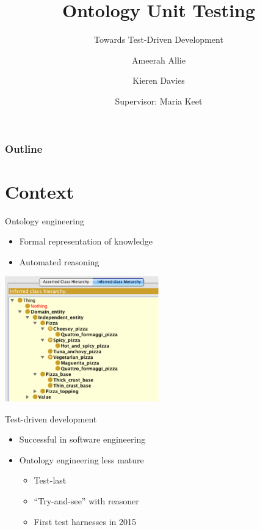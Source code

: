 \documentclass[17pt,mathserif]{beamer}
\begin{document}
\title{Ontology Unit Testing}
\subtitle{Towards Test-Driven Development}
\author{Ameerah Allie \and Kieren Davies \and Supervisor: Maria Keet}
\date{}
\titlepage

\begin{frame}
  \frametitle{Outline}
  \tableofcontents
\end{frame}

\section{Context}

\begin{frame}{Ontology engineering}
  \begin{itemize}
    \item Formal representation of knowledge
    \item Automated reasoning
  \end{itemize}
  \centering
  \includegraphics[width=0.5\textwidth]{pizza}
\end{frame}

\begin{frame}{Test-driven development}
  \begin{itemize}
    \item Successful in software engineering
    \item Ontology engineering less mature
    \begin{itemize}
      \item Test-last
      \item ``Try-and-see'' with reasoner
      \item First test harnesses in 2015
    \end{itemize}
  \end{itemize}
\end{frame}
\end{document}
